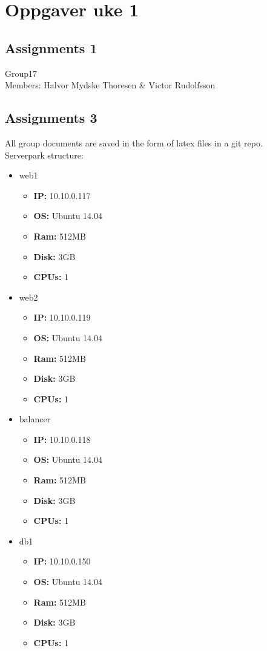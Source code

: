 \section{Oppgaver uke 1}

\subsection{Assignments 1}  
Group17\\
	 Members: Halvor Mydske Thoresen \& Victor Rudolfsson\\
\subsection{Assignments 3}  
All group documents are saved in the form of latex files in a git repo. \\
Serverpark structure: 
\small
\begin{itemize}
	\item web1
		\begin{itemize}
			\item \textbf{IP:} 10.10.0.117
			\item \textbf{OS:} Ubuntu 14.04
			\item \textbf{Ram:} 512MB
			\item \textbf{Disk:} 3GB
			\item \textbf{CPUs:} 1
		\end{itemize}
	\item web2
		\begin{itemize}
			\item \textbf{IP:} 10.10.0.119
			\item \textbf{OS:} Ubuntu 14.04
			\item \textbf{Ram:} 512MB
			\item \textbf{Disk:} 3GB
			\item \textbf{CPUs:} 1
		\end{itemize}
	\item balancer
		\begin{itemize}
			\item \textbf{IP:} 10.10.0.118
			\item \textbf{OS:} Ubuntu 14.04
			\item \textbf{Ram:} 512MB
			\item \textbf{Disk:} 3GB
			\item \textbf{CPUs:} 1
		\end{itemize}
	\item db1
		\begin{itemize}
			\item \textbf{IP:} 10.10.0.150
			\item \textbf{OS:} Ubuntu 14.04
			\item \textbf{Ram:} 512MB
			\item \textbf{Disk:} 3GB
			\item \textbf{CPUs:} 1
		\end{itemize}
\end{itemize}


